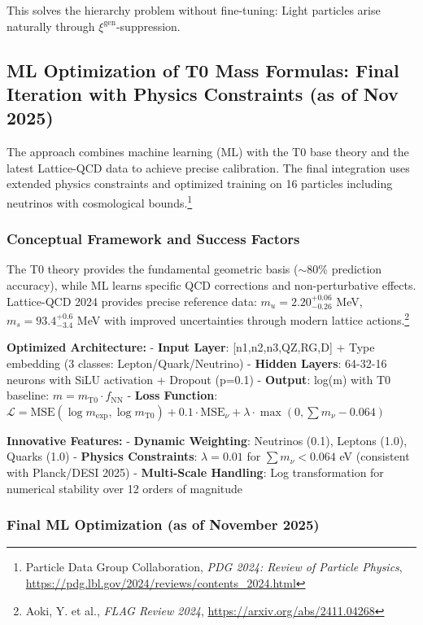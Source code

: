 	This solves the hierarchy problem without fine-tuning: Light particles arise naturally through $\xi^{\text{gen}}$-suppression.
	
	\subsection{ML Optimization of T0 Mass Formulas: Final Iteration with Physics Constraints (as of Nov 2025)}
	\label{sec:ml-optimization}
	
	The approach combines machine learning (ML) with the T0 base theory and the latest Lattice-QCD data to achieve precise calibration. The final integration uses extended physics constraints and optimized training on 16 particles including neutrinos with cosmological bounds.\footnote{Particle Data Group Collaboration, \emph{PDG 2024: Review of Particle Physics}, \url{https://pdg.lbl.gov/2024/reviews/contents\_2024.html}}
	
	\subsubsection{Conceptual Framework and Success Factors}
	
	The T0 theory provides the fundamental geometric basis ($\sim$80\% prediction accuracy), while ML learns specific QCD corrections and non-perturbative effects. Lattice-QCD 2024 provides precise reference data: $m_u=2.20^{+0.06}_{-0.26}$ MeV, $m_s=93.4^{+0.6}_{-3.4}$ MeV with improved uncertainties through modern lattice actions.\footnote{Aoki, Y. et al., \emph{FLAG Review 2024}, \url{https://arxiv.org/abs/2411.04268}}
	
	\textbf{Optimized Architecture:}
	- \textbf{Input Layer}: [n1,n2,n3,QZ,RG,D] + Type embedding (3 classes: Lepton/Quark/Neutrino)
	- \textbf{Hidden Layers}: 64-32-16 neurons with SiLU activation + Dropout (p=0.1)
	- \textbf{Output}: log(m) with T0 baseline: $m = m_{\text{T0}} \cdot f_{\text{NN}}$
	- \textbf{Loss Function}: $\mathcal{L} = \text{MSE}(\log m_{\exp}, \log m_{\text{T0}}) + 0.1\cdot\text{MSE}_{\nu} + \lambda\cdot\max(0,\sum m_{\nu}-0.064)$
	
	\textbf{Innovative Features:}
	- \textbf{Dynamic Weighting}: Neutrinos (0.1), Leptons (1.0), Quarks (1.0)
	- \textbf{Physics Constraints}: $\lambda=0.01$ for $\sum m_{\nu} < 0.064$ eV (consistent with Planck/DESI 2025)
	- \textbf{Multi-Scale Handling}: Log transformation for numerical stability over 12 orders of magnitude
	
	\subsubsection{Final ML Optimization (as of November 2025)}
	

